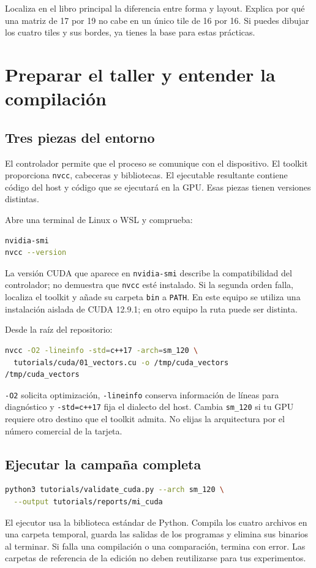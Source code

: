 \documentclass[12pt,a4paper,oneside]{report}
\begin{document}
\begin{comprueba}
Localiza en el libro principal la diferencia entre forma y layout. Explica por qué una matriz de 17 por 19 no cabe en un único tile de 16 por 16. Si puedes dibujar los cuatro tiles y sus bordes, ya tienes la base para estas prácticas.

\end{comprueba}
\chapter{Preparar el taller y entender la compilación}
\section{Tres piezas del entorno}
El controlador permite que el proceso se comunique con el dispositivo. El toolkit proporciona \texttt{nvcc}, cabeceras y bibliotecas. El ejecutable resultante contiene código del host y código que se ejecutará en la GPU. Esas piezas tienen versiones distintas.

Abre una terminal de Linux o WSL y comprueba:

\begin{lstlisting}[language=bash]
nvidia-smi
nvcc --version
\end{lstlisting}
La versión CUDA que aparece en \texttt{nvidia-smi} describe la compatibilidad del controlador; no demuestra que \texttt{nvcc} esté instalado. Si la segunda orden falla, localiza el toolkit y añade su carpeta \texttt{bin} a \texttt{PATH}. En este equipo se utiliza una instalación aislada de CUDA 12.9.1; en otro equipo la ruta puede ser distinta.

Desde la raíz del repositorio:

\begin{lstlisting}[language=bash]
nvcc -O2 -lineinfo -std=c++17 -arch=sm_120 \
  tutorials/cuda/01_vectors.cu -o /tmp/cuda_vectors
/tmp/cuda_vectors
\end{lstlisting}
\texttt{-O2} solicita optimización, \texttt{-lineinfo} conserva información de líneas para diagnóstico y \texttt{-std=c++17} fija el dialecto del host. Cambia \texttt{sm\_120} si tu GPU requiere otro destino que el toolkit admita. No elijas la arquitectura por el número comercial de la tarjeta.

\section{Ejecutar la campaña completa}
\begin{lstlisting}[language=bash]
python3 tutorials/validate_cuda.py --arch sm_120 \
  --output tutorials/reports/mi_cuda
\end{lstlisting}
El ejecutor usa la biblioteca estándar de Python. Compila los cuatro archivos en una carpeta temporal, guarda las salidas de los programas y elimina sus binarios al terminar. Si falla una compilación o una comparación, termina con error. Las carpetas de referencia de la edición no deben reutilizarse para tus experimentos.
\end{document}

